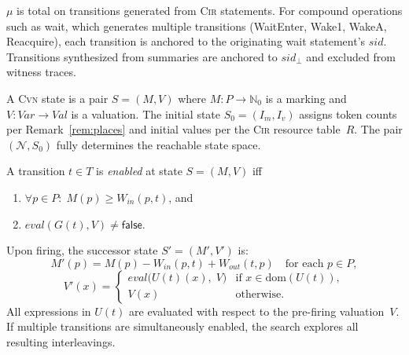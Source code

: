 
\begin{remark}
\label{rem:anchor}
$\mu$ is total on transitions generated from \textsc{Cir} statements. For compound operations such as \textsf{wait}, which generates multiple transitions (WaitEnter, Wake1, WakeA, Reacquire), each transition is anchored to the originating \textsf{wait} statement's $\mathit{sid}$. Transitions synthesized from summaries are anchored to $\mathit{sid}_{\bot}$ and excluded from witness traces.
\end{remark}

\begin{definition}
\label{def:cvn-state}
A \textsc{Cvn} state is a pair $S=(M,V)$ where $M:P\to\mathbb{N}_0$ is a marking and $V:\mathit{Var}\to\mathit{Val}$ is a valuation. The initial state $S_0=(I_m,I_v)$ assigns token counts per Remark~\ref{rem:places} and initial values per the \textsc{Cir} resource table~$R$. The pair $(\mathcal{N},S_0)$ fully determines the reachable state space.
\end{definition}

\begin{definition}
\label{def:enabling-firing}
A transition $t\in T$ is \emph{enabled} at state $S=(M,V)$ iff
\begin{enumerate}
  \item $\forall p\in P:\; M(p)\geq W_{\!\mathit{in}}(p,t)$, and
  \item $\mathit{eval}(G(t),V)\neq\mathsf{false}$.
\end{enumerate}
Upon firing, the successor state $S'=(M',V')$ is:
\[
  M'(p)=M(p)-W_{\!\mathit{in}}(p,t)+W_{\!\mathit{out}}(t,p)
  \quad\text{for each }p\in P,
\]
\[
  V'(x)=
  \begin{cases}
    \mathit{eval}\bigl(U(t)(x),\;V\bigr)
      & \text{if } x\in\mathrm{dom}(U(t)),\\
    V(x) & \text{otherwise.}
  \end{cases}
\]
All expressions in $U(t)$ are evaluated with respect to the pre-firing valuation~$V$.
If multiple transitions are simultaneously enabled, the search explores all resulting interleavings.
\end{definition}


